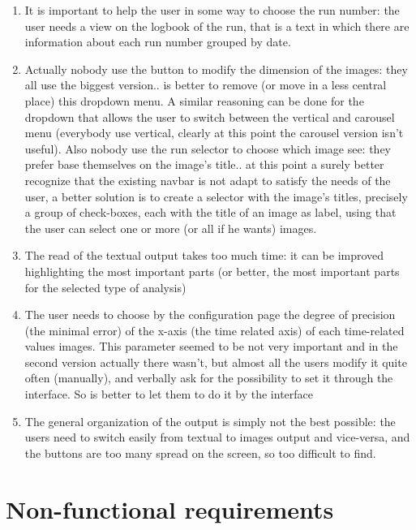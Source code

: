 \begin{enumerate}
\item 
It is important to help the user in some way to choose the run number: the user needs a view on the logbook of the run, that is a text in which there are information about each run number grouped by date.

\item
Actually nobody use the button to modify the dimension of the images: they all use the biggest version.. is better to remove (or move in a less central place) this dropdown menu. A similar reasoning can be done for the dropdown that allows the user to switch between the vertical and carousel menu (everybody use vertical, clearly at this point the carousel version isn't useful). Also nobody use the run selector to choose which image see: they prefer base themselves on the image's title.. at this point a surely better recognize that the existing navbar is not adapt to satisfy the needs of the user, a better solution is to create a selector with the image's titles, precisely a group of check-boxes, each with the title of an image as label, using that the user can select one or more (or all if he wants) images.  

\item
The read of the textual output takes too much time: it can be improved highlighting the most important parts (or better, the most important parts for the selected type of analysis)

\item
The user needs to choose by the configuration page the degree of precision (the minimal error) of the x-axis (the time related axis) of each time-related values images. This parameter seemed to be not very important and in the second version actually there wasn't, but almost all the users modify it quite often (manually), and verbally ask for the possibility to set it through the interface. So is better to let them to do it by the interface

\item
The general organization of the output is simply not the best possible: the users need to switch easily from textual to images output and vice-versa, and the buttons are too many spread on the screen, so too difficult to find.

\end{enumerate}

\section{Non-functional requirements}


